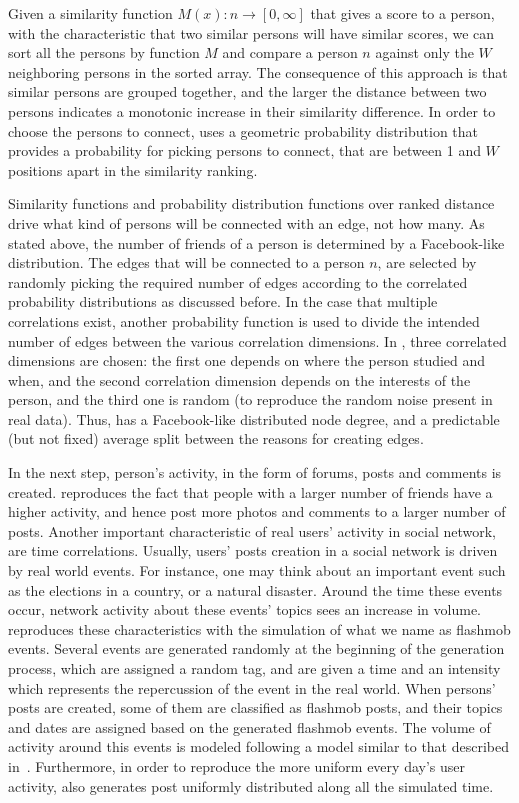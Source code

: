 Given a similarity function $M(x) : n \rightarrow [0, \infty]$ that gives a score to a person,
with the characteristic that two similar persons will have similar scores, we
can sort all the persons by function $M$ and compare a person $n$ against only the
$W$ neighboring persons in the sorted array. The consequence of this approach is
that similar persons are grouped together, and the larger the
distance between two persons indicates a monotonic increase in their similarity
difference. In order to choose the persons to connect, \datagen uses a geometric
probability distribution that provides a probability for picking persons to
connect, that are between 1 and $W$ positions apart in the similarity
ranking.

Similarity functions and probability distribution functions over ranked
distance drive what kind of persons will be connected with an edge, not how
many. As stated above, the number of friends of a person is determined by a
Facebook-like distribution. The edges that will be connected to a person $n$,
are selected by randomly picking the required number of edges according to the
correlated probability distributions as discussed before. In the case that
multiple correlations exist, another probability function is used to divide the
intended number of edges between the various correlation dimensions. In \datagen,
three correlated dimensions are chosen: the first one depends on where the
person studied and when, and the second correlation dimension depends on the
interests of the person, and the third one is random (to reproduce the random
noise present in real data). Thus, \datagen has a Facebook-like distributed node
degree, and a predictable (but not fixed) average split between the reasons for
creating edges.

In the next step, person's activity, in the form of forums, posts and comments
is created. \datagen reproduces the fact that people with a larger number of
friends have a higher activity, and hence post more photos and comments to a
larger number of posts. Another important characteristic of real users'
activity in social network, are time correlations.  Usually, users' posts
creation in a social network is driven by real world events.  For
instance, one may think about an important event such as the elections in a
country, or a natural disaster. Around the time these events occur, network
activity about these events' topics sees an increase in volume. \datagen
reproduces these characteristics with the simulation of what we name as
flashmob events.  Several events are generated randomly at the beginning of the
generation process, which are assigned a random tag, and are given a time and
an intensity which represents the repercussion of the event in the real world.
When persons' posts are created, some of them are classified as flashmob posts,
and their topics and dates are assigned based on the generated flashmob events.
The volume of activity around this events is modeled following a model similar
to that described in~\cite{DBLP:conf/kdd/LeskovecBKT08}. Furthermore, in order to reproduce the
more uniform every day's user activity, \datagen also generates post uniformly
distributed along all the simulated time.

